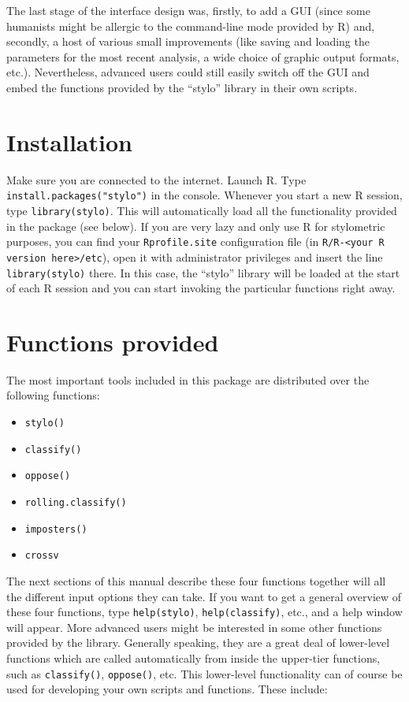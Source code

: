 \documentclass[11pt,a4paper]{article}
\def\code#1{{\tt #1}}
\begin{document}
The last stage of the interface design was, firstly, to add a GUI
(since some humanists might be allergic to the command-line mode provided
by R) and, secondly, a host of various small improvements (like saving
and loading the parameters for the most recent analysis, a wide choice
of graphic output formats, etc.). Nevertheless, advanced users could
still easily switch off the GUI and embed the functions provided by
the ``stylo'' library in their own scripts.


\section{Installation}

Make sure you are connected to the internet. Launch R. Type \code{install.packages("stylo")}
in the console. Whenever you start a new R session, type \code{library(stylo)}.
This will automatically load all the functionality provided in the
package (see below). If you are very lazy and only use R for stylometric
purposes, you can find your \code{Rprofile.site} configuration file 
(in \code{R/R-<your R version here>/etc}), open it with administrator privileges
and insert the line \code{library(stylo)} there. In this case, the
``stylo'' library will be loaded at the start of each R session and you
can start invoking the particular functions right away.


\section{Functions provided}

The most important tools included in this package are distributed
over the following functions:

\begin{itemize}
  \item \code{stylo()}
  \item \code{classify()} 
  \item \code{oppose()} 
  \item \code{rolling.classify()}
  \item \code{imposters()}
  \item \code{crossv} 
\end{itemize}

The next sections of this manual describe these four functions together
will all the different input options they can take. If you want to
get a general overview of these four functions, type \code{help(stylo)},
\code{help(classify)}, etc., and a help window will appear. More
advanced users might be interested in some other functions
provided by the library. Generally speaking, they are a great deal
of lower-level functions which are called automatically from inside
the upper-tier functions, such as \code{classify()}, \code{oppose()},
etc. This lower-level functionality can of course be used for developing
your own scripts and functions. These include:
\end{document}
